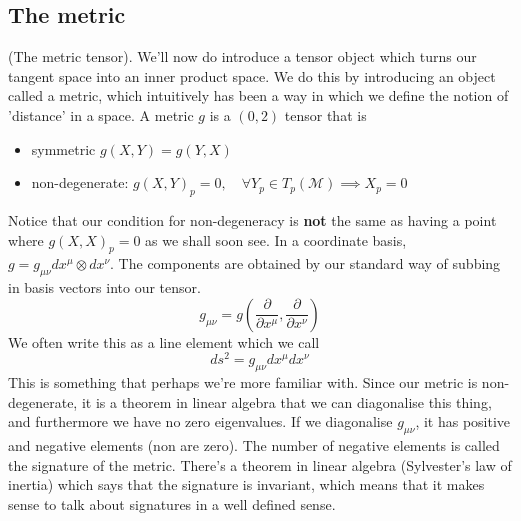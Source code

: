 \subsection{ The metric}

\begin{defn}{(The metric tensor). } 
We'll now do introduce a tensor object which 
turns our tangent space into an inner product space. 
We do this by introducing an object called a metric, 
which intuitively has been a way in which we define 
the notion of 'distance' in a space. 
A metric $ g $ is a $ ( 0, 2 ) $ tensor that is
\begin{itemize}
\item  symmetric $ g ( X, Y )  = g ( Y , X) $
\item non-degenerate: $ g ( X, Y )_ p = 0, \quad \forall Y_p \in T_p ( \mathcal{ M }) \implies X_p = 0$ 
\end{itemize}
\end{defn}
Notice that our condition for non-degeneracy is \textbf{not}
the same as having a point where  $ g ( X, X )_p = 0 $ as we
shall soon see. 
In a coordinate basis, $ g = g_{ \mu \nu } dx ^ \mu  \otimes dx^ \nu $.
The components are obtained by our standard way of 
subbing in basis vectors into our tensor. 
\[
	g _{\mu \nu  } = g \left( \frac{\partial }{\partial  x^ \mu } , \frac{\partial }{\partial x^ \nu } \right)  
\]  We often write this as 
a line element which we call 
\[
ds^ 2 = g_{ \mu \nu } dx^ \mu dx ^ \nu 
\] This is something that perhaps we're more 
familiar with. 
Since our metric is non-degenerate, it is 
a theorem in linear algebra that we can diagonalise this thing, and furthermore 
we have no zero eigenvalues. 
If we diagonalise $ g _{ \mu \nu }$, 
it has positive and negative elements (non are zero). 
The number of negative elements is called the 
signature of the metric. 
There's a theorem in linear algebra (Sylvester's law of inertia) 
which says that the signature is invariant, which means that 
it makes sense to talk about signatures in a well defined sense. 

